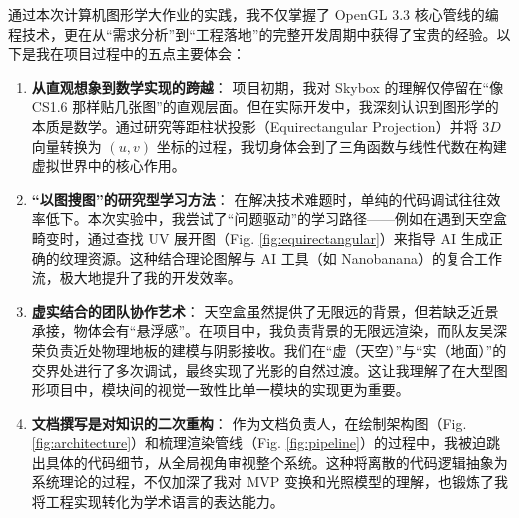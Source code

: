 \documentclass[a4paper]{article}
\begin{document}
通过本次计算机图形学大作业的实践，我不仅掌握了 OpenGL 3.3 核心管线的编程技术，更在从“需求分析”到“工程落地”的完整开发周期中获得了宝贵的经验。以下是我在项目过程中的五点主要体会：

\begin{enumerate}
    \item \textbf{从直观想象到数学实现的跨越}：
    项目初期，我对 Skybox 的理解仅停留在“像 CS1.6 那样贴几张图”的直观层面。但在实际开发中，我深刻认识到图形学的本质是数学。通过研究等距柱状投影（Equirectangular Projection）并将 $3D$ 向量转换为 $(u,v)$ 坐标的过程，我切身体会到了三角函数与线性代数在构建虚拟世界中的核心作用。

    \item \textbf{“以图搜图”的研究型学习方法}：
    在解决技术难题时，单纯的代码调试往往效率低下。本次实验中，我尝试了“问题驱动”的学习路径——例如在遇到天空盒畸变时，通过查找 UV 展开图（Fig. \ref{fig:equirectangular}）来指导 AI 生成正确的纹理资源。这种结合理论图解与 AI 工具（如 Nanobanana）的复合工作流，极大地提升了我的开发效率。

    \item \textbf{虚实结合的团队协作艺术}：
    天空盒虽然提供了无限远的背景，但若缺乏近景承接，物体会有“悬浮感”。在项目中，我负责背景的无限远渲染，而队友吴深荣负责近处物理地板的建模与阴影接收。我们在“虚（天空）”与“实（地面）”的交界处进行了多次调试，最终实现了光影的自然过渡。这让我理解了在大型图形项目中，模块间的视觉一致性比单一模块的实现更为重要。

    \item \textbf{文档撰写是对知识的二次重构}：
    作为文档负责人，在绘制架构图（Fig. \ref{fig:architecture}）和梳理渲染管线（Fig. \ref{fig:pipeline}）的过程中，我被迫跳出具体的代码细节，从全局视角审视整个系统。这种将离散的代码逻辑抽象为系统理论的过程，不仅加深了我对 MVP 变换和光照模型的理解，也锻炼了我将工程实现转化为学术语言的表达能力。
\end{enumerate}
\end{document}
